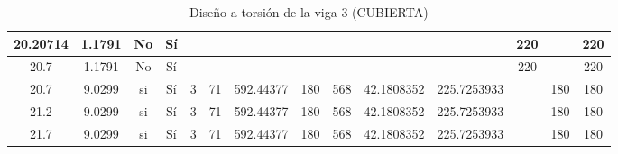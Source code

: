 \begin{table}[H]
{\begin{tabular}{|c|c|c|c|c|c|c|c|c|c|c|c|c|c|}
\hline
20.20714 & 1.1791 & No  & Sí  &     &     &     &     &     &     &     & 220 &     & 220 \bigstrut\\
\hline
20.7 & 1.1791 & No  & Sí  &     &     &     &     &     &     &     & 220 &     & 220 \bigstrut\\
\hline
20.7 & 9.0299 & si  & Sí  & 3   & 71  & 592.44377 & 180 & 568 & 42.1808352 & 225.7253933 &     & 180 & 180 \bigstrut\\
\hline
21.2 & 9.0299 & si  & Sí  & 3   & 71  & 592.44377 & 180 & 568 & 42.1808352 & 225.7253933 &     & 180 & 180 \bigstrut\\
\hline
21.7 & 9.0299 & si  & Sí  & 3   & 71  & 592.44377 & 180 & 568 & 42.1808352 & 225.7253933 &     & 180 & 180 \bigstrut\\
\hline
\end{tabular}%

  



  }
      \caption{Diseño a torsión de la viga 3 (CUBIERTA) }
  \label{tab:T VG3 CUB }%
\end{table}%